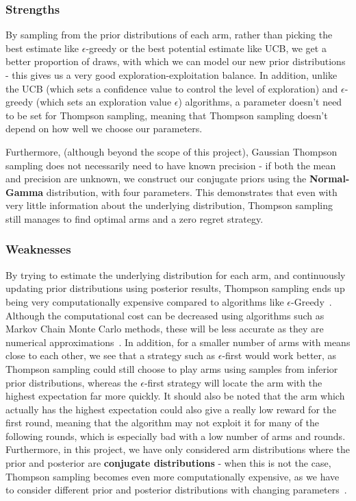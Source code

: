 \subsubsection{Strengths}
By sampling from the prior distributions of each arm, rather than picking the best estimate like $\epsilon$-greedy or the best potential estimate like UCB, we get a better proportion of draws, with which we can model our new prior distributions - this gives us a very good exploration-exploitation balance.
In addition, unlike the UCB (which sets a confidence value to control the level of exploration) and $\epsilon$-greedy (which sets an exploration value $\epsilon$) algorithms, a parameter doesn't need to be set for Thompson sampling, meaning that Thompson sampling doesn't depend on how well we choose our parameters.

Furthermore, (although beyond the scope of this project), Gaussian Thompson sampling does not necessarily need to have known precision - if both the mean and precision are unknown, we construct our conjugate priors using the \textbf{Normal-Gamma} distribution, with four parameters.
This demonstrates that even with very little information about the underlying distribution, Thompson sampling still manages to find optimal arms and a zero regret strategy.

\subsubsection{Weaknesses}
By trying to estimate the underlying distribution for each arm, and continuously updating prior distributions using posterior results, Thompson sampling ends up being very computationally expensive compared to algorithms like $\epsilon$-Greedy~\citep{mazumdar2020thompson}.
Although the computational cost can be decreased using algorithms such as Markov Chain Monte Carlo methods, these will be less accurate as they are numerical approximations~\citep{mazumdar2020thompson}.
In addition, for a smaller number of arms with means close to each other, we see that a strategy such as $\epsilon$-first would work better, as Thompson sampling could still choose to play arms using samples from inferior prior distributions, whereas the $\epsilon$-first strategy will locate the arm with the highest expectation far more quickly.
It should also be noted that the arm which actually has the highest expectation could also give a really low reward for the first round, meaning that the algorithm may not exploit it for many of the following rounds, which is especially bad with a low number of arms and rounds.
Furthermore, in this project, we have only considered arm distributions where the prior and posterior are \textbf{conjugate distributions} - when this is not the case, Thompson sampling becomes even more computationally expensive, as we have to consider different prior and posterior distributions with changing parameters~\citep{zhou2018racing}.

